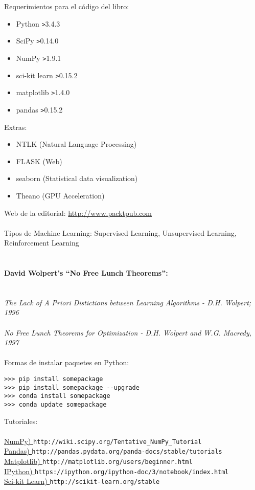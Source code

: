 \documentclass[12pt]{article}
\begin{document}
Requerimientos para el código del libro:
\begin{itemize}
\item Python \verb+>+3.4.3
\item SciPy \verb+>+0.14.0
\item NumPy \verb+>+1.9.1
\item sci-kit learn \verb+>+0.15.2
\item matplotlib \verb+>+1.4.0
\item pandas \verb+>+0.15.2
\end{itemize}

Extras:
\begin{itemize}
\item NTLK (Natural Language Processing)
\item FLASK (Web)
\item seaborn (Statistical data visualization)
\item Theano (GPU Acceleration)
\end{itemize}

Web de la editorial:  \href{http://www.packtpub.com}{http://www.packtpub.com}\\
\\
Tipos de Machine Learning: Supervised Learning, Unsupervised Learning, Reinforcement Learning
\\
\\
\paragraph{David Wolpert's ``No Free Lunch Theorems'':\\ \\}
\textit{The Lack of A Priori Distictions between Learning Algorithms - D.H. Wolpert; 1996}
\\ \\
\textit{No Free Lunch Theorems for Optimization - D.H. Wolpert and W.G. Macredy, 1997}
\\ \\
Formas de instalar paquetes en Python:\\
\begin{verbatim}
>>> pip install somepackage
>>> pip install somepackage --upgrade
>>> conda install somepackage
>>> conda update somepackage
\end{verbatim}
Tutoriales:\\ \\
\href{http://wiki.scipy.org/Tentative_NumPy_Tutorial}{NumPy) }\verb+http://wiki.scipy.org/Tentative_NumPy_Tutorial+ \\
\href{http://pandas.pydata.org/panda-docs/stable/tutorials}{Pandas) }\verb+http://pandas.pydata.org/panda-docs/stable/tutorials+ \\
\href{http://matplotlib.org/users/beginner.html}{Matplotlib) }\verb+http://matplotlib.org/users/beginner.html+ \\
\href{https://ipython.org/ipython-doc/3/notebook/index.html}{IPython) }\verb+https://ipython.org/ipython-doc/3/notebook/index.html+\\
\href{http://scikit-learn.org/stable}{Sci-kit Learn) }\verb+http://scikit-learn.org/stable+\\ \\
\end{document}
